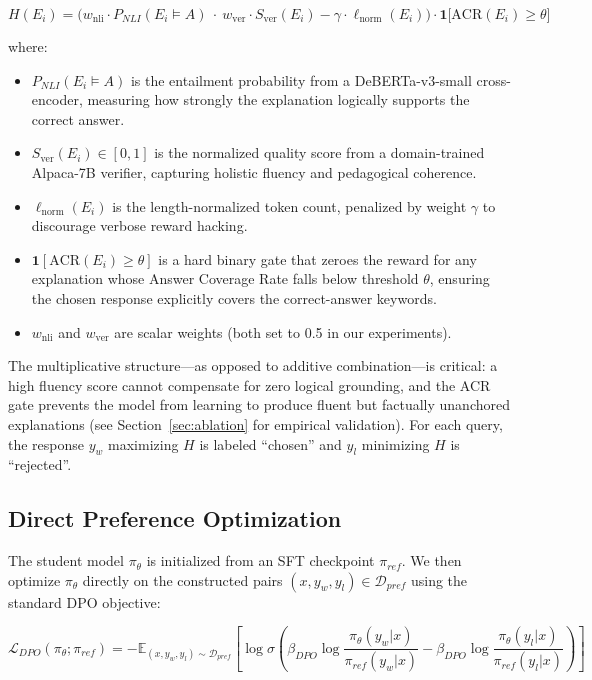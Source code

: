 \begin{equation}
    H(E_i) = \bigl(w_{\text{nli}} \cdot P_{NLI}(E_i \models A)\ \cdot\ w_{\text{ver}} \cdot S_{\text{ver}}(E_i) - \gamma \cdot \ell_{\text{norm}}(E_i)\bigr) \cdot \mathbf{1}\bigl[\text{ACR}(E_i) \geq \theta\bigr]
\end{equation}

where:
\begin{itemize}
    \item $P_{NLI}(E_i \models A)$ is the entailment probability from a DeBERTa-v3-small cross-encoder, measuring how strongly the explanation logically supports the correct answer.
    \item $S_{\text{ver}}(E_i) \in [0,1]$ is the normalized quality score from a domain-trained Alpaca-7B verifier, capturing holistic fluency and pedagogical coherence.
    \item $\ell_{\text{norm}}(E_i)$ is the length-normalized token count, penalized by weight $\gamma$ to discourage verbose reward hacking.
    \item $\mathbf{1}[\text{ACR}(E_i) \geq \theta]$ is a hard binary gate that zeroes the reward for any explanation whose Answer Coverage Rate falls below threshold $\theta$, ensuring the chosen response explicitly covers the correct-answer keywords.
    \item $w_{\text{nli}}$ and $w_{\text{ver}}$ are scalar weights (both set to 0.5 in our experiments).
\end{itemize}

The multiplicative structure—as opposed to additive combination—is critical: a high fluency score cannot compensate for zero logical grounding, and the ACR gate prevents the model from learning to produce fluent but factually unanchored explanations (see Section~\ref{sec:ablation} for empirical validation). For each query, the response $y_w$ maximizing $H$ is labeled ``chosen'' and $y_l$ minimizing $H$ is ``rejected''.

\subsection{Direct Preference Optimization}
The student model $\pi_\theta$ is initialized from an SFT checkpoint $\pi_{ref}$. We then optimize $\pi_\theta$ directly on the constructed pairs $(x, y_w, y_l) \in \mathcal{D}_{pref}$ using the standard DPO objective:

\begin{equation}
    \mathcal{L}_{DPO}(\pi_\theta; \pi_{ref}) = -\mathbb{E}_{(x, y_w, y_l)\sim \mathcal{D}_{pref}} \left[ \log \sigma \left( \beta_{DPO} \log \frac{\pi_\theta(y_w|x)}{\pi_{ref}(y_w|x)} - \beta_{DPO} \log \frac{\pi_\theta(y_l|x)}{\pi_{ref}(y_l|x)} \right) \right]
\end{equation}
